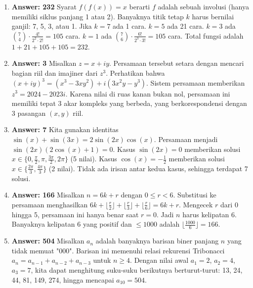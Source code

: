 \documentclass[12pt]{scrartcl}
\begin{document}
\begin{enumerate}
\item  \textbf{Answer: 232} Syarat $f(f(x)) = x$ berarti $f$ adalah sebuah involusi (hanya memiliki siklus panjang 1 atau 2). Banyaknya titik tetap $k$ harus bernilai ganjil: 7, 5, 3, atau 1. Jika $k=7$ ada 1 cara. $k=5$ ada 21 cara. $k=3$ ada $\binom{7}{4} \cdot \frac{4!}{2^2 \cdot 2!} = 105$ cara. $k=1$ ada $\binom{7}{6} \cdot \frac{6!}{2^3 \cdot 3!} = 105$ cara. Total fungsi adalah $1 + 21 + 105 + 105 = 232$.

\item  \textbf{Answer: 3} Misalkan $z = x + iy$. Persamaan tersebut setara dengan mencari bagian riil dan imajiner dari $z^3$. Perhatikan bahwa $(x+iy)^3 = (x^3-3xy^2) + i(3x^2y-y^3)$. Sistem persamaan memberikan $z^3 = 2024 - 2023i$. Karena nilai di ruas kanan bukan nol, persamaan ini memiliki tepat 3 akar kompleks yang berbeda, yang berkorespondensi dengan 3 pasangan $(x,y)$ riil.

\item  \textbf{Answer: 7} Kita gunakan identitas $\sin(x) + \sin(3x) = 2 \sin(2x) \cos(x)$. Persamaan menjadi $\sin(2x) (2 \cos(x) + 1) = 0$. Kasus $\sin(2x) = 0$ memberikan solusi $x \in \{0, \frac{\pi}{2}, \pi, \frac{3\pi}{2}, 2\pi\}$ (5 nilai). Kasus $\cos(x) = -\frac{1}{2}$ memberikan solusi $x \in \{\frac{2\pi}{3}, \frac{4\pi}{3}\}$ (2 nilai). Tidak ada irisan antar kedua kasus, sehingga terdapat 7 solusi.

\item  \textbf{Answer: 166} Misalkan $n = 6k + r$ dengan $0 \le r < 6$. Substitusi ke persamaan menghasilkan $6k + \lfloor \frac{r}{2} \rfloor + \lfloor \frac{r}{3} \rfloor + \lfloor \frac{r}{6} \rfloor = 6k + r$. Mengecek $r$ dari 0 hingga 5, persamaan ini hanya benar saat $r = 0$. Jadi $n$ harus kelipatan 6. Banyaknya kelipatan 6 yang positif dan $\le 1000$ adalah $\lfloor \frac{1000}{6} \rfloor = 166$.

\item  \textbf{Answer: 504} Misalkan $a_n$ adalah banyaknya barisan biner panjang $n$ yang tidak memuat "000". Barisan ini memenuhi relasi rekurensi Tribonacci $a_n = a_{n-1} + a_{n-2} + a_{n-3}$ untuk $n \ge 4$. Dengan nilai awal $a_1 = 2$, $a_2 = 4$, $a_3 = 7$, kita dapat menghitung suku-suku berikutnya berturut-turut: 13, 24, 44, 81, 149, 274, hingga mencapai $a_{10} = 504$.
\end{enumerate}
\end{document}

